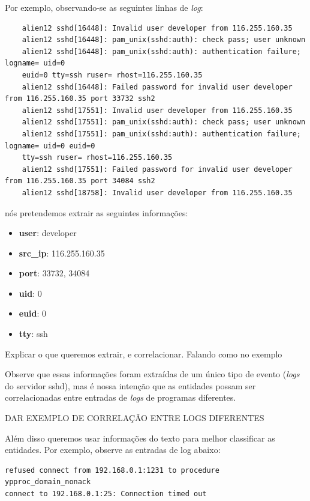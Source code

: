\documentclass[
	12pt,				%
	openright,			%
	twoside,			%
	a4paper,			%
	english,			%
	french,				%
	spanish,			%
	brazil,				%
	]{abntex2}
\begin{document}
Por exemplo, observando-se as seguintes linhas de \emph{log}:

{\tiny
	\begin{verbatim}
	alien12 sshd[16448]: Invalid user developer from 116.255.160.35
	alien12 sshd[16448]: pam_unix(sshd:auth): check pass; user unknown
	alien12 sshd[16448]: pam_unix(sshd:auth): authentication failure; logname= uid=0 
	euid=0 tty=ssh ruser= rhost=116.255.160.35 
	alien12 sshd[16448]: Failed password for invalid user developer from 116.255.160.35 port 33732 ssh2
	alien12 sshd[17551]: Invalid user developer from 116.255.160.35
	alien12 sshd[17551]: pam_unix(sshd:auth): check pass; user unknown
	alien12 sshd[17551]: pam_unix(sshd:auth): authentication failure; logname= uid=0 euid=0 
	tty=ssh ruser= rhost=116.255.160.35 
	alien12 sshd[17551]: Failed password for invalid user developer from 116.255.160.35 port 34084 ssh2
	alien12 sshd[18758]: Invalid user developer from 116.255.160.35
	\end{verbatim}
}

nós pretendemos extrair as seguintes informações:

\begin{itemize}
	\item \textbf{user}: developer	
	\item \textbf{src\_ip}: 116.255.160.35	
	\item \textbf{port}: 33732, 34084	
	\item \textbf{uid}: 0	
	\item \textbf{euid}: 0	
	\item \textbf{tty}: ssh 
\end{itemize}

Explicar o que queremos extrair, e correlacionar. Falando como no exemplo

Observe que essas informações foram extraídas de um único tipo de evento (\emph{logs} do servidor sshd), mas é nossa intenção que as entidades possam ser correlacionadas entre entradas de \emph{logs} de programas diferentes.

DAR EXEMPLO DE CORRELAÇÃO ENTRE LOGS DIFERENTES

Além disso queremos usar informações do texto para melhor classificar as entidades.
Por exemplo, observe as entradas de log abaixo:

{\tiny
\begin{verbatim}
refused connect from 192.168.0.1:1231 to procedure ypproc_domain_nonack 
connect to 192.168.0.1:25: Connection timed out
\end{verbatim}
}
\end{document}
